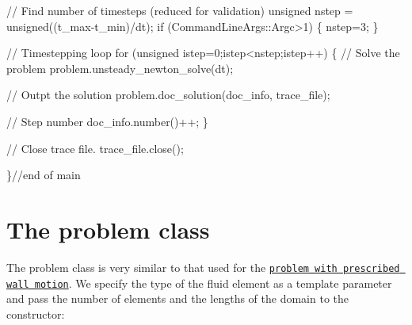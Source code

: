 \begin{DoxyCodeInclude}

 \textcolor{comment}{// Find number of timesteps (reduced for validation)}
 \textcolor{keywordtype}{unsigned} nstep = unsigned((t\_max-t\_min)/dt);
 \textcolor{keywordflow}{if} (CommandLineArgs::Argc>1)
  \{
   nstep=3;
  \}
 
 \textcolor{comment}{// Timestepping loop}
 \textcolor{keywordflow}{for} (\textcolor{keywordtype}{unsigned} istep=0;istep<nstep;istep++)
  \{
   \textcolor{comment}{// Solve the problem}
   problem.unsteady\_newton\_solve(dt);
   
   \textcolor{comment}{// Outpt the solution}
   problem.doc\_solution(doc\_info, trace\_file);
   
   \textcolor{comment}{// Step number}
   doc\_info.number()++;
  \}


 \textcolor{comment}{// Close trace file.}
 trace\_file.close();

\}\textcolor{comment}{//end of main}

\end{DoxyCodeInclude}




 

\hypertarget{index_problemclass}{}\section{The problem class}\label{index_problemclass}
The problem class is very similar to that used for the \href{../../../navier_stokes/collapsible_channel/html/index.html}{\tt problem with prescribed wall motion}. We specify the type of the fluid element as a template parameter and pass the number of elements and the lengths of the domain to the constructor\+:


